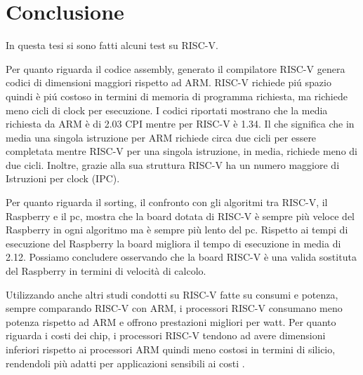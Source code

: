 \documentclass[12pt, a4paper]{report}
\begin{document}

\chapter{Conclusione}

In questa tesi si sono fatti alcuni test su RISC-V. 


Per quanto riguarda il codice assembly, generato il compilatore RISC-V genera codici di dimensioni maggiori rispetto ad ARM. RISC-V richiede pi\'u spazio quindi è pi\'u costoso in termini di memoria di programma richiesta, ma richiede meno cicli di clock per esecuzione. I codici riportati mostrano che la media richiesta da ARM è di 2.03 CPI mentre per RISC-V è 1.34. Il che significa che in media una singola istruzione per ARM richiede circa due cicli per essere completata mentre RISC-V per una singola istruzione, in media, richiede meno di due cicli. Inoltre, grazie alla sua struttura RISC-V ha un numero maggiore di Istruzioni per clock (IPC). 

Per quanto riguarda il sorting, il confronto con gli algoritmi tra RISC-V, il Raspberry e il pc, mostra che la board dotata di RISC-V è sempre più veloce del Raspberry in ogni algoritmo ma è sempre più lento del pc. Rispetto ai tempi di esecuzione del Raspberry la board
migliora il tempo di esecuzione in media di 2.12. 
Possiamo concludere osservando che la board RISC-V è una valida sostituta del Raspberry in termini di velocità di calcolo.%

Utilizzando anche altri studi condotti su RISC-V fatte su consumi e potenza,
sempre comparando RISC-V con ARM, i processori RISC-V consumano meno potenza rispetto ad ARM e offrono prestazioni migliori per watt.  Per quanto riguarda i costi dei chip, i processori RISC-V tendono ad avere dimensioni inferiori rispetto ai processori ARM quindi meno costosi in termini di silicio, rendendoli più adatti per applicazioni sensibili ai costi \cite{blogArmRISC-V}.
\end{document}
